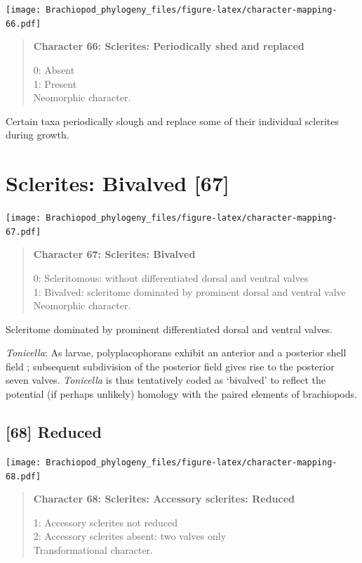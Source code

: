 \documentclass[openany]{book}
\begin{document}
\texttt{[image: Brachiopod\_phylogeny\_files/figure-latex/character-mapping-66.pdf]}

\begin{quote}
\textbf{Character 66: Sclerites: Periodically shed and replaced}

0: Absent\\
1: Present\\
Neomorphic character.
\end{quote}

Certain taxa periodically slough and replace some of their individual
sclerites during growth.

\section{Sclerites: Bivalved {[}67{]}}\label{sclerites-bivalved-67}

\texttt{[image: Brachiopod\_phylogeny\_files/figure-latex/character-mapping-67.pdf]}

\begin{quote}
\textbf{Character 67: Sclerites: Bivalved}

0: Scleritomous: without differentiated dorsal and ventral valves\\
1: Bivalved: scleritome dominated by prominent dorsal and ventral
valve\\
Neomorphic character.
\end{quote}

Scleritome dominated by prominent differentiated dorsal and ventral
valves.

\hypertarget{Tonicella-coding-67}{}
\emph{Tonicella}: As larvae, polyplacophorans exhibit an anterior and a
posterior shell field \citep{Wanninger2002C}; subsequent subdivision of
the posterior field gives rise to the posterior seven valves.
\emph{Tonicella} is thus tentatively coded as `bivalved' to reflect the
potential (if perhaps unlikely) homology with the paired elements of
brachiopods.

\subsection*{{[}68{]} Reduced}\label{reduced}

\texttt{[image: Brachiopod\_phylogeny\_files/figure-latex/character-mapping-68.pdf]}

\begin{quote}
\textbf{Character 68: Sclerites: Accessory sclerites: Reduced}

1: Accessory sclerites not reduced\\
2: Accessory sclerites absent: two valves only\\
Transformational character.
\end{quote}
\end{document}
